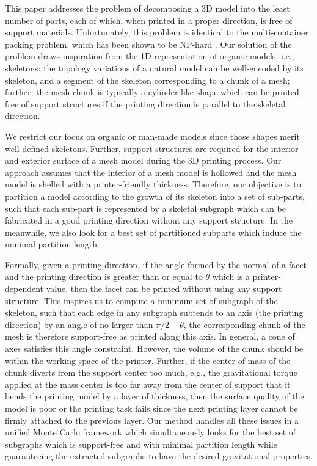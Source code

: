 This paper addresses the problem of decomposing a 3{D} model into the least number of parts, each of which, when printed in a proper direction, is free of support materials. Unfortunately, this problem is identical to the multi-container packing problem, which has been shown to be NP-hard \cite{Fukunaga:2007}. Our solution of the problem draws inspiration from the 1{D} representation of organic models, i.e., skeletons: the topology variations of a natural model can be well-encoded by its skeleton, and a segment of the skeleton corresponding to a chunk of a mesh; further, the mesh chunk is typically a cylinder-like shape which can be printed free of support structures if the printing direction is parallel to the skeletal direction.

We restrict our focus on organic or man-made models since those shapes merit well-defined skeletons. Further, support structures are required for the interior and exterior surface of a mesh model during the 3{D} printing process. Our approach assumes that the interior of a mesh model is hollowed and the mesh model is shelled with a printer-friendly thickness. Therefore, our objective is to partition a model according to the growth of its skeleton into a set of sub-parts, such that each sub-part is represented by a skeletal subgraph which can be fabricated in a good printing direction without any support structure. In the meanwhile, we also look for a best set of partitioned subparts which induce the minimal partition length.

Formally, given a printing direction, if the angle formed by the normal of a facet and the printing direction is greater than or equal to $\theta$ which is a printer-dependent value, then the facet can be printed without using any support structure. This inspires us to compute a minimum set of subgraph of the skeleton, such that each edge in any subgraph subtends to an axis (the printing direction) by an angle of no larger than $\pi/2 - \theta$, the corresponding chunk of the mesh is therefore support-free as printed along this axis. In general, a cone of axes satisfies this angle constraint. However, the volume of the chunk should be within the working space of the printer. Further, if the center of mass of the chunk diverts from the support center too much, e.g., the gravitational torque applied at the mass center is too far away from the center of support that it bends the printing model by a layer of thickness, then the surface quality of the model is poor or the printing task fails since the next printing layer cannot be firmly attached to the previous layer. Our method handles all these issues in a unified Monte Carlo framework which simultaneously looks for the best set of subgraphs which is support-free and with minimal partition length while guaranteeing the extracted subgraphs to have the desired gravitational properties.

